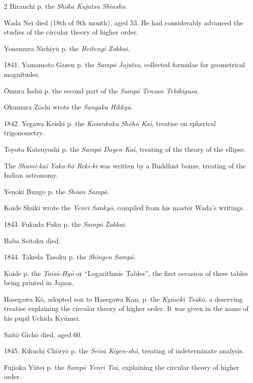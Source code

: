 \documentclass[11pt]{article}
\newcommand{\scanfooter}{}
\begin{document}
\begin{multicols}{2}
Hirauchi p. the \emph{Shōka Kujutsu Shinsho}.

Wada Nei died (18th of 9th month), aged 53. He had considerably advanced the studies of the circular theory of higher order.

Yonemura Nichiyū p. the \emph{Heitengi Zokkai}.

1841. Yamamoto Gazen p. the \emph{Sampō Jojutsu}, collected formulae for geometrical magnitudes.

Ōmura Isshū p. the second part of the \emph{Sampō Tenzan Tebikigusa}.

Okumura Zōchi wrote the \emph{Sangaku Hikkyū}.

1842. Yegawa Keishi p. the \emph{Kosankaku Shōhō Kai}, treatise on spherical trigonometry.

Toyota Katsuyoshi p. the \emph{Sampō Dayen Kai}, treating of the theory of the ellipse.

The \emph{Shumi-kai Yaku-hō Reki-ki} was written by a Buddhist bonze, treating of the Indian astronomy.

Yenoki Bungo p. the \emph{Shōan Sampō}.

Koide Shūki wrote the \emph{Yenri Sankyō}, compiled from his master Wada's writings.

1843. Fukuda Fuku p. the \emph{Sampō Zakkai}.

Baba Seitoku died.

1844. Takeda Tasoku p. the \emph{Shingen Sampō}.

Koide p. the \emph{Taisū-Hyō} or ``Logarithmic Tables'', the first occasion of these tables being printed in Japan.

Hasegawa Kō, adopted son to Hasegawa Kan, p. the \emph{Kyūseki Tsūkō}, a deserving treatise explaining the circular theory of higher order. It was given in the name of his pupil Uchida Kyūmei.

Saitō Gichō died, aged 60.

1845. Kikuchi Chōryō p. the \emph{Seisū Kigen-shō}, treating of indeterminate analysis.

Fujioka Yūtei p. the \emph{Sampō Yenri Tsū}, explaining the circular theory of higher order.
\end{multicols}
\scanfooter
\end{document}
